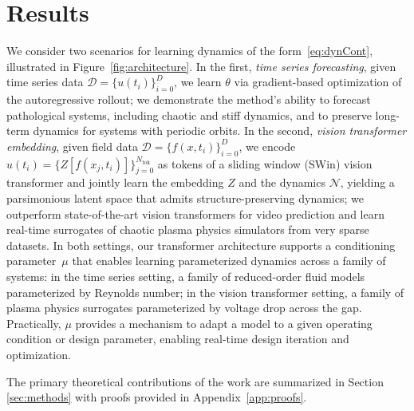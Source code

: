 \documentclass[12pt]{article}
\begin{document}
\section{Results}

We consider two scenarios for learning dynamics of the form~\eqref{eq:dynCont}, illustrated in Figure~\ref{fig:architecture}. In the first, \emph{time series forecasting}, given time series data $\mathcal{D} = \{u(t_i)\}_{i=0}^{D}$, we learn $\theta$ via gradient-based optimization of the autoregressive rollout; we demonstrate the method's ability to forecast pathological systems, including chaotic and stiff dynamics, and to preserve long-term dynamics for systems with periodic orbits. In the second, \emph{vision transformer embedding}, given field data $\mathcal{D} = \{f(x,t_i)\}_{i=0}^{D}$, we encode $u(t_i) = \{Z[f(x_j,t_i)]\}_{j=0}^{N_{\mathrm{tok}}}$ as tokens of a sliding window (SWin) vision transformer and jointly learn the embedding $Z$ and the dynamics $\mathcal{N}$, yielding a parsimonious latent space that admits structure-preserving dynamics; we outperform state-of-the-art vision transformers for video prediction and learn real-time surrogates of chaotic plasma physics simulators from very sparse datasets. In both settings, our transformer architecture supports a conditioning parameter~$\mu$ that enables learning parameterized dynamics across a family of systems: in the time series setting, a family of reduced-order fluid models parameterized by Reynolds number; in the vision transformer setting, a family of plasma physics surrogates parameterized by voltage drop across the gap. Practically, $\mu$ provides a mechanism to adapt a model to a given operating condition or design parameter, enabling real-time design iteration and optimization.

The primary theoretical contributions of the work are summarized in Section \ref{sec:methods} with proofs provided in Appendix~\ref{app:proofs}. 
\end{document}
